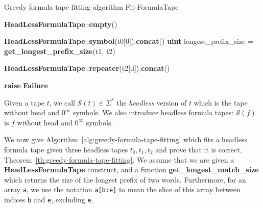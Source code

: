 \begin{algorithm}
    \caption{Greedy formula tape fitting algorithm {\sc Fit-FormulaTape}}\label{alg:greedy-formula-tape-fitting}
    \begin{algorithmic}[1]


        \State \Return \textbf{HeadLessFormulaTape}::\textbf{empty}()

        \EndIf
        \State
        \State \Return \textbf{HeadLessFormulaTape}::\textbf{symbol}(t0[0]).\textbf{concat}()
        \EndIf
        \State
        \State
        \textbf{uint} longest\_prefix\_size = \textbf{get\_longest\_prefix\_size}(t1, t2)
        \State

        \State \Return \textbf{HeadLessFormulaTape}::\textbf{repeater}(t2[:l]).\textbf{concat}()
        \EndIf

        \EndFor
        \State
        \State \textbf{raise} \textbf{Failure}
        \EndProcedure
    \end{algorithmic}
\end{algorithm}


Given a tape $t$, we call $\mathcal{S}(t) \in \Sigma^*$ the \textit{headless} version of $t$ which is the tape without head and $0^\infty$ symbols. We also introduce headless formula tapes: $\mathcal{S}(f)$ is $f$ without head and $0^\infty$ symbols.

We now give Algorithm~\ref{alg:greedy-formula-tape-fitting} which fits a headless formula tape given three headless tapes $t_0, t_1, t_2$ and prove that it is correct, Theorem~\ref{th:greedy-formula-tape-fitting}. We assume that we are given a \textbf{HeadLessFormulaTape} construct, and a function \textbf{get\_longest\_match\_size} which returns the size of the longest prefix of two words. Furthermore, for an array \texttt{a}, we use the notation \texttt{a[b:e]} to mean the slice of this array between indices \texttt{b} and \texttt{e}, excluding \texttt{e}.

